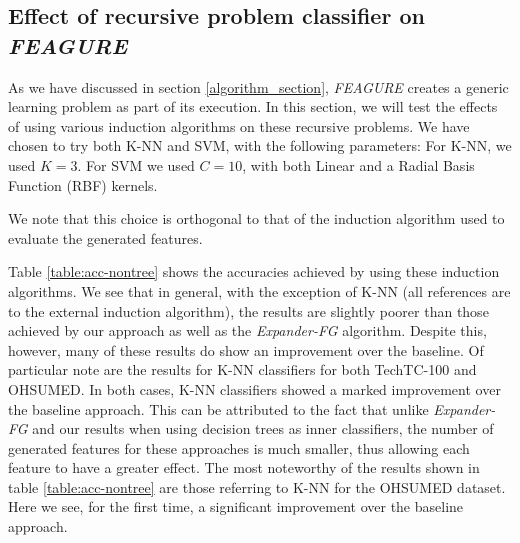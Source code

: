 \documentclass{article}
\theoremstyle{definition}
\begin{document}
		
		
		
		
		

\subsection{Effect of recursive problem classifier on \emph{FEAGURE}}

As we have discussed in section \ref{algorithm_section}, \emph{FEAGURE} creates a generic learning problem as part of its execution. In this section, we will test the effects of using various induction algorithms on these recursive problems. We have chosen to try both K-NN and SVM, with the following parameters: For K-NN, we used $K=3$. For SVM we used $C=10$, with both Linear and a Radial Basis Function (RBF) kernels.

We note that this choice is orthogonal to that of the induction algorithm used to evaluate the generated features.

Table \ref{table:acc-nontree} shows the accuracies achieved by using these induction algorithms. We see that in general, with the exception of K-NN (all references are to the external induction algorithm), the results are slightly poorer than those achieved by our approach as well as the \emph{Expander-FG} algorithm. Despite this, however,  many of these results do show an improvement over the baseline.
Of particular note are the results for K-NN classifiers for both TechTC-100 and OHSUMED. In both cases, K-NN classifiers showed a marked improvement over the baseline approach. This can be attributed to the fact that unlike \emph{Expander-FG} and our results when using decision trees as inner classifiers, the number of generated features for these approaches is much smaller, thus allowing each feature to have a greater effect.
The most noteworthy of the results shown in table \ref{table:acc-nontree} are those referring to K-NN for the OHSUMED dataset. Here we see, for the first time, a significant improvement over the baseline approach.
\end{document}
